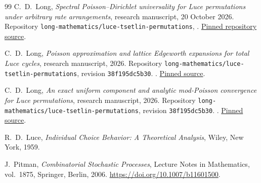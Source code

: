 \documentclass[11pt]{article}
\numberwithin{equation}{section}
\theoremstyle{definition}
\theoremstyle{remark}
\begin{document}
\begin{thebibliography}{99}
C.~D.~Long,
\emph{Spectral Poisson--Dirichlet universality for Luce permutations
under arbitrary rate arrangements},
research manuscript, 20 October 2026.
Repository \texttt{long-mathematics/luce-tsetlin-permutations},
.
\href{https://github.com/long-mathematics/luce-tsetlin-permutations/blob/81462993a7400f972a3d75583d447fbeccf1e7b3/papers/macroscopic-pd/spectral-poisson-dirichlet-luce.tex}{Pinned repository source}.

C.~D.~Long,
\emph{Poisson approximation and lattice Edgeworth expansions for total Luce cycles},
research manuscript, 2026.
Repository \texttt{long-mathematics/luce-tsetlin-permutations},
revision \texttt{38f195dc5b30}.
.
\href{https://github.com/long-mathematics/luce-tsetlin-permutations/blob/38f195dc5b30812ebbf084764016e857a68b9a1c/papers/total-cycle-edgeworth/total-cycle-edgeworth.tex}{Pinned source}.

C.~D.~Long,
\emph{An exact uniform component and analytic mod-Poisson convergence for Luce permutations},
research manuscript, 2026.
Repository \texttt{long-mathematics/luce-tsetlin-permutations},
revision \texttt{38f195dc5b30}.
.
\href{https://github.com/long-mathematics/luce-tsetlin-permutations/blob/38f195dc5b30812ebbf084764016e857a68b9a1c/papers/mod-poisson/luce_mod_poisson.tex}{Pinned source}.

R.~D.~Luce, \emph{Individual Choice Behavior: A Theoretical Analysis},
Wiley, New York, 1959.

J.~Pitman, \emph{Combinatorial Stochastic Processes},
Lecture Notes in Mathematics, vol.~1875, Springer, Berlin, 2006.
\url{https://doi.org/10.1007/b11601500}.

\end{thebibliography}
\end{document}

